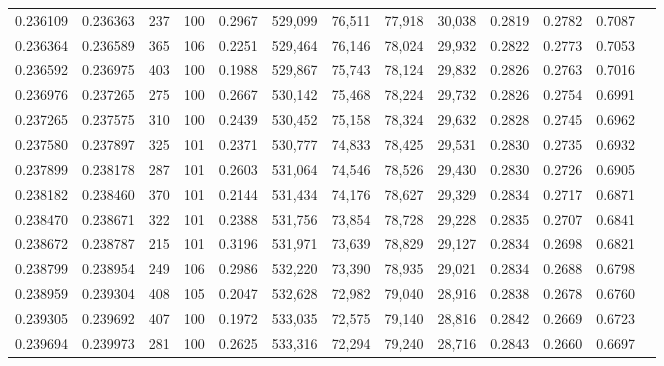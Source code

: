 \begin{tabular}{rrrrrrrrrrrrr}
0.236109 & 0.236363 &   237 & 100 &                                     0.2967 & 529,099 &  76,511 &  77,918 &  30,038 & 0.2819 & 0.2782 & 0.7087 \\
0.236364 & 0.236589 &   365 & 106 &                                     0.2251 & 529,464 &  76,146 &  78,024 &  29,932 & 0.2822 & 0.2773 & 0.7053 \\
0.236592 & 0.236975 &   403 & 100 &                                     0.1988 & 529,867 &  75,743 &  78,124 &  29,832 & 0.2826 & 0.2763 & 0.7016 \\
0.236976 & 0.237265 &   275 & 100 &                                     0.2667 & 530,142 &  75,468 &  78,224 &  29,732 & 0.2826 & 0.2754 & 0.6991 \\
0.237265 & 0.237575 &   310 & 100 &                                     0.2439 & 530,452 &  75,158 &  78,324 &  29,632 & 0.2828 & 0.2745 & 0.6962 \\
0.237580 & 0.237897 &   325 & 101 &                                     0.2371 & 530,777 &  74,833 &  78,425 &  29,531 & 0.2830 & 0.2735 & 0.6932 \\
0.237899 & 0.238178 &   287 & 101 &                                     0.2603 & 531,064 &  74,546 &  78,526 &  29,430 & 0.2830 & 0.2726 & 0.6905 \\
0.238182 & 0.238460 &   370 & 101 &                                     0.2144 & 531,434 &  74,176 &  78,627 &  29,329 & 0.2834 & 0.2717 & 0.6871 \\
0.238470 & 0.238671 &   322 & 101 &                                     0.2388 & 531,756 &  73,854 &  78,728 &  29,228 & 0.2835 & 0.2707 & 0.6841 \\
0.238672 & 0.238787 &   215 & 101 &                                     0.3196 & 531,971 &  73,639 &  78,829 &  29,127 & 0.2834 & 0.2698 & 0.6821 \\
0.238799 & 0.238954 &   249 & 106 &                                     0.2986 & 532,220 &  73,390 &  78,935 &  29,021 & 0.2834 & 0.2688 & 0.6798 \\
0.238959 & 0.239304 &   408 & 105 &                                     0.2047 & 532,628 &  72,982 &  79,040 &  28,916 & 0.2838 & 0.2678 & 0.6760 \\
0.239305 & 0.239692 &   407 & 100 &                                     0.1972 & 533,035 &  72,575 &  79,140 &  28,816 & 0.2842 & 0.2669 & 0.6723 \\
0.239694 & 0.239973 &   281 & 100 &                                     0.2625 & 533,316 &  72,294 &  79,240 &  28,716 & 0.2843 & 0.2660 & 0.6697 \\

\end{tabular}
